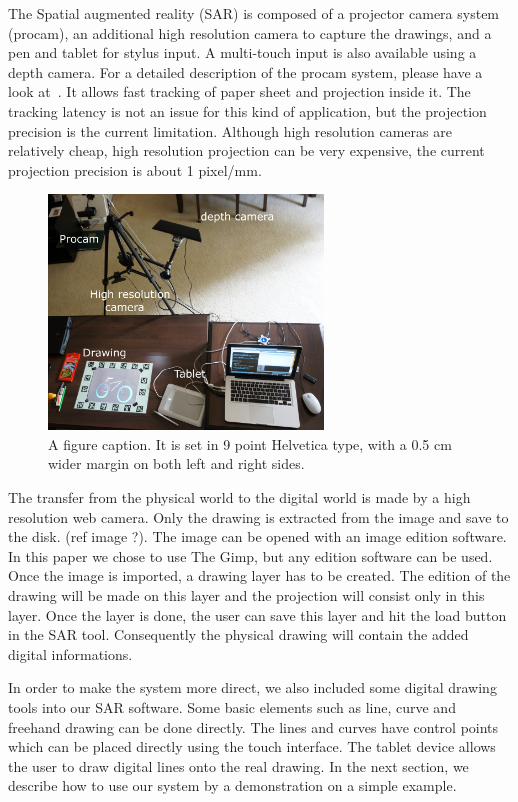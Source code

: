 \documentclass{article}
\begin{document}
The Spatial augmented reality (SAR) is composed of a projector camera system (procam), an additional high resolution camera to capture the drawings, and a pen and tablet for stylus input. A multi-touch input is also available using a depth camera. For a detailed description of the procam system, please have a look at~\cite{laviole:2012}. It allows fast tracking of paper sheet and projection inside it. The tracking latency is not an issue for this kind of application, but the projection precision is the current limitation. Although high resolution cameras are relatively cheap, high resolution projection can be very expensive, the current projection precision is about 1 pixel/mm. 


\begin{figure}[tb]
\includegraphics[width = 73mm]{DSC00299-2-rogne-annote.JPG}
\caption{A figure caption.  It is set in 9 point Helvetica type, with a
0.5 cm wider margin on both left and right sides.} 
\label{fig:setup}
\end{figure}

The transfer from the physical world to the digital world is made by a high resolution web camera. Only the drawing is extracted from the image and save to the disk. (ref image ?). The image can be opened with an image edition software. In this paper we chose to use The Gimp, but any edition software can be used. Once the image is imported, a drawing layer has to be created. The edition of the drawing will be made on this layer and the projection will consist only in this layer. Once the  layer is done, the user can save this layer and hit the load button in the SAR tool. Consequently the physical drawing will contain the added digital informations.  

In order to make the system more direct, we also included some digital drawing tools into our SAR software. Some basic elements such as line, curve and freehand drawing can be done directly. The lines and curves have control points which can be placed directly using the touch interface. The tablet device allows the user to draw digital lines onto the real drawing. In the next section, we describe how to use our system by a demonstration on a simple example. 
\end{document}
